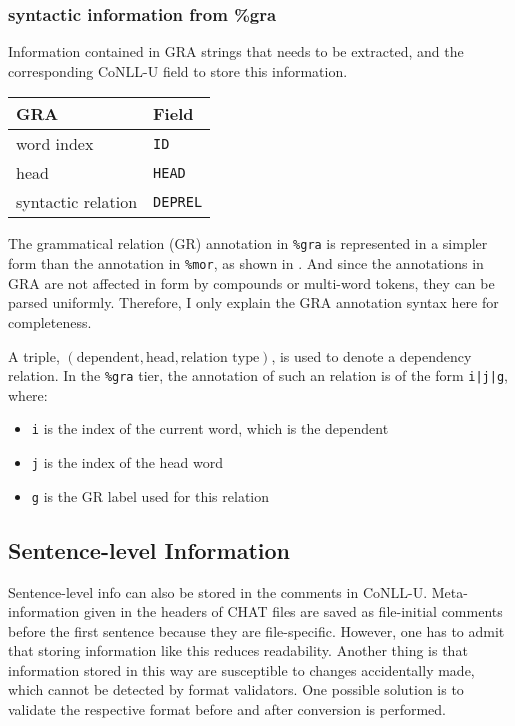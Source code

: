 \subsubsection{syntactic information from \%gra}

\begin{margintable}[1\baselineskip]
\caption{\label{tab:martabgra}Information contained in GRA strings that needs to be extracted, and the corresponding CoNLL-U field to store this information.}
\begin{tabularx}{1\textwidth}{@{}ll@{}}
\toprule
\textbf{GRA} & \textbf{Field}\\\midrule
word index & \texttt{ID} \\
head & \texttt{HEAD}\\
syntactic relation & \texttt{DEPREL} \\\bottomrule
\end{tabularx}
\end{margintable}

The grammatical relation (GR) annotation in \texttt{\%gra} is represented in a simpler form than the annotation in \texttt{\%mor}, as shown in . And since the annotations in GRA are not affected in form by compounds or multi-word tokens, they can be parsed uniformly. Therefore, I only explain the GRA annotation syntax here for completeness.

A triple, $(\text{dependent}, \text{head}, \text{relation type})$, is used to denote a dependency relation. In the \texttt{\%gra} tier, the annotation of such an relation is of the form \texttt{i|j|g}, where:
\begin{itemize}
	\item \texttt{i} is the index of the current word, which is the dependent
	\item \texttt{j} is the index of the head word
	\item \texttt{g} is the GR label used for this relation
\end{itemize}


\subsection{Sentence-level Information}

Sentence-level info can also be stored in the comments in CoNLL-U. Meta-information given in the headers of CHAT files are saved as file-initial comments before the first sentence because they are file-specific.
However, one has to admit that storing information like this reduces readability. Another thing is that information stored in this way are susceptible to changes accidentally made, which cannot be detected by format validators. One possible solution is to validate the respective format before and after conversion is performed.



